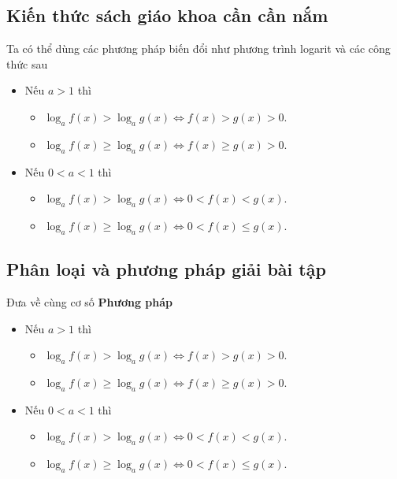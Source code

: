 \subsection{Kiến thức sách giáo khoa cần cần nắm}
Ta có thể dùng các phương pháp biến đổi như phương trình logarit và các công thức sau
\begin{itemize}
	\item Nếu $a>1$ thì
	\begin{itemize}
		\item $\log_af(x)>\log_ag(x)\Leftrightarrow f(x)>g(x)>0$.
		\item $\log_af(x)\geq\log_ag(x)\Leftrightarrow f(x)\geq g(x)>0$.
	\end{itemize}
	\item Nếu $0<a<1$ thì
	\begin{itemize}
		\item $\log_af(x)>\log_ag(x)\Leftrightarrow 0<f(x)<g(x)$.
		\item $\log_af(x)\geq\log_ag(x)\Leftrightarrow 0<f(x)\leq g(x)$.
	\end{itemize}
\end{itemize}
\subsection{Phân loại và phương pháp giải bài tập}
\begin{dang}{Đưa về cùng cơ số}
	\textbf{Phương pháp}
	\begin{itemize}
		\item Nếu $a>1$ thì
		\begin{itemize}
			\item $\log_af(x)>\log_ag(x)\Leftrightarrow f(x)>g(x)>0$.
			\item $\log_af(x)\geq\log_ag(x)\Leftrightarrow f(x)\geq g(x)>0$.
		\end{itemize}
		\item Nếu $0<a<1$ thì
		\begin{itemize}
			\item $\log_af(x)>\log_ag(x)\Leftrightarrow 0<f(x)<g(x)$.
			\item $\log_af(x)\geq\log_ag(x)\Leftrightarrow 0<f(x)\leq g(x)$.
		\end{itemize}
	\end{itemize}
\end{dang}
